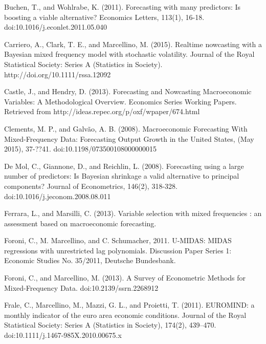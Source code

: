 Buchen, T., and Wohlrabe, K. (2011). Forecasting with many predictors: Is boosting a viable alternative? Economics Letters, 113(1), 16-18. doi:10.1016/j.econlet.2011.05.040








Carriero, A., Clark, T. E., and Marcellino, M. (2015). Realtime nowcasting with a Bayesian mixed frequency model with stochastic volatility. Journal of the Royal Statistical Society: Series A (Statistics in Society).  http://doi.org/10.1111/rssa.12092



Castle, J., and Hendry, D. (2013). Forecasting and Nowcasting Macroeconomic Variables: A Methodological Overview. Economics Series Working Papers. Retrieved from http://ideas.repec.org/p/oxf/wpaper/674.html


Clements, M. P., and Galvão, A. B. (2008). Macroeconomic Forecasting With Mixed-Frequency Data: Forecasting Output Growth in the United States, (May 2015), 37-??41. doi:10.1198/073500108000000015







De Mol, C., Giannone, D., and Reichlin, L. (2008). Forecasting using a large number of predictors: Is Bayesian shrinkage a valid alternative to principal components? Journal of Econometrics, 146(2), 318-328. doi:10.1016/j.jeconom.2008.08.011   





Ferrara, L., and Marsilli, C. (2013). Variable selection with mixed frequencies : an assessment based on macroeconomic forecasting.





Foroni, C., M. Marcellino, and C. Schumacher, 2011. U-MIDAS: MIDAS regressions with unrestricted lag polynomials. Discussion Paper Series 1: Economic Studies No. 35/2011, Deutsche Bundesbank.





Foroni, C., and Marcellino, M. (2013). A Survey of Econometric Methods for Mixed-Frequency Data. doi:10.2139/ssrn.2268912

Frale, C., Marcellino, M., Mazzi, G. L., and Proietti, T. (2011). EUROMIND: a monthly indicator of the euro area economic conditions. Journal of the Royal Statistical Society: Series A (Statistics in Society), 174(2), 439–470. doi:10.1111/j.1467-985X.2010.00675.x

